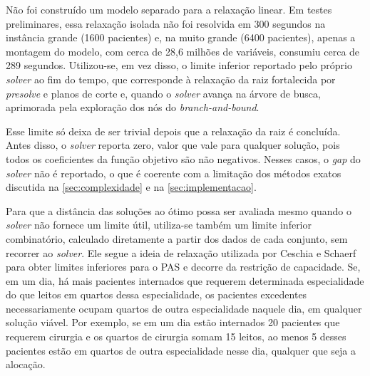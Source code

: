 \begin{itemize}
    Não foi construído um modelo separado para a relaxação linear. Em testes preliminares, essa relaxação isolada não foi resolvida em 300 segundos na instância grande (1600 pacientes) e, na muito grande (6400 pacientes), apenas a montagem do modelo, com cerca de 28,6 milhões de variáveis, consumiu cerca de 289 segundos. Utilizou-se, em vez disso, o limite inferior reportado pelo próprio \textit{solver} ao fim do tempo, que corresponde à relaxação da raiz fortalecida por \textit{presolve} e planos de corte e, quando o \textit{solver} avança na árvore de busca, aprimorada pela exploração dos nós do \textit{branch-and-bound}.

    Esse limite só deixa de ser trivial depois que a relaxação da raiz é concluída. Antes disso, o \textit{solver} reporta zero, valor que vale para qualquer solução, pois todos os coeficientes da função objetivo são não negativos. Nesses casos, o \textit{gap} do \textit{solver} não é reportado, o que é coerente com a limitação dos métodos exatos discutida na \autoref{sec:complexidade} e na \autoref{sec:implementacao}.

    Para que a distância das soluções ao ótimo possa ser avaliada mesmo quando o \textit{solver} não fornece um limite útil, utiliza-se também um limite inferior combinatório, calculado diretamente a partir dos dados de cada conjunto, sem recorrer ao \textit{solver}. Ele segue a ideia de relaxação utilizada por Ceschia e Schaerf \cite{ceschia2011local} para obter limites inferiores para o PAS e decorre da restrição de capacidade. Se, em um dia, há mais pacientes internados que requerem determinada especialidade do que leitos em quartos dessa especialidade, os pacientes excedentes necessariamente ocupam quartos de outra especialidade naquele dia, em qualquer solução viável. Por exemplo, se em um dia estão internados 20 pacientes que requerem cirurgia e os quartos de cirurgia somam 15 leitos, ao menos 5 desses pacientes estão em quartos de outra especialidade nesse dia, qualquer que seja a alocação.


\end{itemize}
